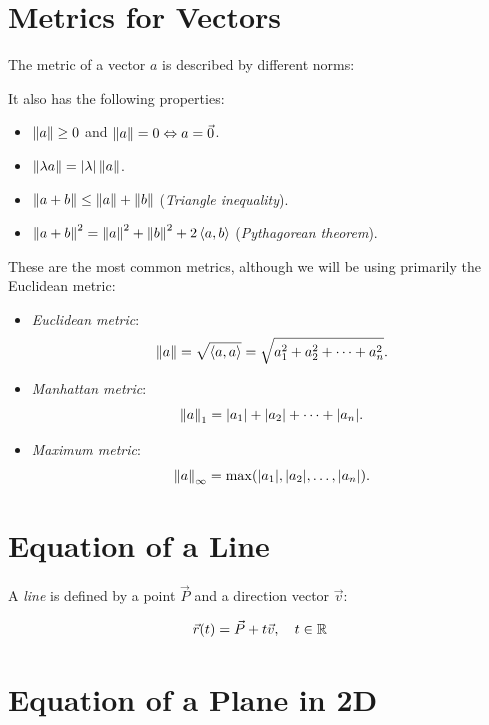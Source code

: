 \section{Metrics for Vectors}

The metric of a vector \(a\) is described by different norms:

It also has the following properties:

\begin{itemize}

	\item \(\left\| a \right\| \geq 0\) and \(\left\| a \right\| = 0 \Leftrightarrow a = \vec{0}\).

	\item \(\left\| \lambda a \right\| = |\lambda| \left\| a \right\|\).

	\item \(\left\| a + b \right\| \leq \left\| a \right\| + \left\| b \right\|\) (\emph{Triangle inequality}).

	\item \(\left\| a + b \right\|^2 = \left\| a \right\|^2 + \left\| b \right\|^2 + 2\left\langle a, b\right\rangle\) (\emph{Pythagorean theorem}).

\end{itemize}

These are the most common metrics, although we will be using primarily the Euclidean metric:

\begin{itemize}

	\item \emph{Euclidean metric}:
	      \[
		      \left\| a \right\| = \sqrt{\left\langle a, a\right\rangle} = \sqrt{a_1^2 + a_2^2 + \cdots + a_n^2}.
	      \]
	\item \emph{Manhattan metric}:
	      \[
		      \left\| a \right\|_1 = |a_1| + |a_2| + \cdots + |a_n|.
	      \]
	\item \emph{Maximum metric}:
	      \[
		      \left\| a \right\|_\infty = \max(|a_1|, |a_2|, \dots , |a_n|).
	      \]
\end{itemize}

\section{Equation of a Line}

A \emph{line} is defined by a point \(\vec{P}\) and a direction vector \(\vec{v}\):

\[
	\vec{r}(t) = \vec{P} + t\vec{v}, \quad t \in \mathbb{R}
\]

\section{Equation of a Plane in 2D}

